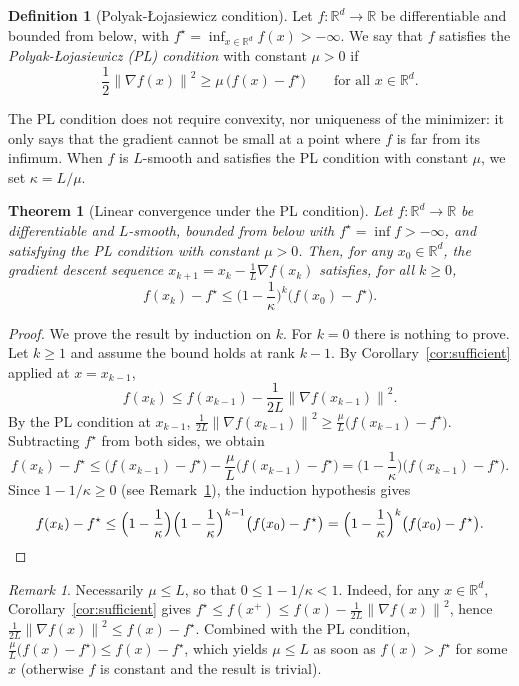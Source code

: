 \documentclass[11pt,a4paper]{article}
\newtheorem{theorem}{Theorem}
\theoremstyle{definition}
\newtheorem{definition}{Definition}
\theoremstyle{remark}
\newtheorem{remark}{Remark}
\newcommand{\R}{\mathbb{R}}
\newcommand{\norm}[1]{\left\lVert #1 \right\rVert}
\begin{document}
\begin{definition}[Polyak-{\L}ojasiewicz condition]
Let $f : \R^d \to \R$ be differentiable and bounded from below, with $f^\star = \inf_{x \in \R^d} f(x) > -\infty$. We say that $f$ satisfies the \emph{Polyak-{\L}ojasiewicz (PL) condition} with constant $\mu > 0$ if
\[
\frac12 \norm{\nabla f(x)}^2 \ge \mu\,\big(f(x) - f^\star\big) \qquad \text{for all } x \in \R^d .
\]
\end{definition}

The PL condition does not require convexity, nor uniqueness of the minimizer: it only says that the gradient cannot be small at a point where $f$ is far from its infimum. When $f$ is $L$-smooth and satisfies the PL condition with constant $\mu$, we set $\kappa = L/\mu$.

\begin{theorem}[Linear convergence under the PL condition]\label{thm:pl}
Let $f : \R^d \to \R$ be differentiable and $L$-smooth, bounded from below with $f^\star = \inf f > -\infty$, and satisfying the PL condition with constant $\mu > 0$. Then, for any $x_0 \in \R^d$, the gradient descent sequence $x_{k+1} = x_k - \frac1L \nabla f(x_k)$ satisfies, for all $k \ge 0$,
\[
f(x_k) - f^\star \le \Big(1 - \frac{1}{\kappa}\Big)^k \big(f(x_0) - f^\star\big).
\]
\end{theorem}

\begin{proof}
We prove the result by induction on $k$. For $k = 0$ there is nothing to prove. Let $k \ge 1$ and assume the bound holds at rank $k-1$. By Corollary~\ref{cor:sufficient} applied at $x = x_{k-1}$,
\[
f(x_k) \le f(x_{k-1}) - \frac{1}{2L}\norm{\nabla f(x_{k-1})}^2 .
\]
By the PL condition at $x_{k-1}$, $\frac{1}{2L}\norm{\nabla f(x_{k-1})}^2 \ge \frac{\mu}{L}\big(f(x_{k-1}) - f^\star\big)$. Subtracting $f^\star$ from both sides, we obtain
\[
f(x_k) - f^\star \le \big(f(x_{k-1}) - f^\star\big) - \frac{\mu}{L}\big(f(x_{k-1}) - f^\star\big) = \Big(1 - \frac{1}{\kappa}\Big)\big(f(x_{k-1}) - f^\star\big).
\]
Since $1 - 1/\kappa \ge 0$ (see Remark~\ref{rem:mu-le-L}), the induction hypothesis gives
\[
f(x_k) - f^\star \le \Big(1 - \frac{1}{\kappa}\Big)\Big(1 - \frac{1}{\kappa}\Big)^{k-1}\big(f(x_0) - f^\star\big) = \Big(1 - \frac{1}{\kappa}\Big)^k \big(f(x_0) - f^\star\big). \qedhere
\]
\end{proof}

\begin{remark}\label{rem:mu-le-L}
Necessarily $\mu \le L$, so that $0 \le 1 - 1/\kappa < 1$. Indeed, for any $x \in \R^d$, Corollary~\ref{cor:sufficient} gives $f^\star \le f(x^+) \le f(x) - \frac{1}{2L}\norm{\nabla f(x)}^2$, hence $\frac{1}{2L}\norm{\nabla f(x)}^2 \le f(x) - f^\star$. Combined with the PL condition, $\frac{\mu}{L}\big(f(x) - f^\star\big) \le f(x) - f^\star$, which yields $\mu \le L$ as soon as $f(x) > f^\star$ for some $x$ (otherwise $f$ is constant and the result is trivial).
\end{remark}
\end{document}
